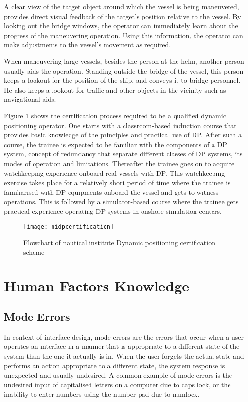 A clear view of the target object around which the vessel is being maneuvered, provides direct visual feedback of the target’s position relative to the vessel. By looking out the bridge windows, the operator can immediately learn about the progress of the maneuvering operation. Using this information, the operator can make adjustments to the vessel's movement as required.

When maneuvering large vessels, besides the person at the helm, another person usually aids the operation. Standing outside the bridge of the vessel, this person keeps a lookout for the position of the ship, and conveys it to bridge personnel. He also keeps a lookout for traffic and other objects in the vicinity such as navigational aids.

Figure \ref{fig:nidpcertification} shows the certification process required to be a qualified dynamic positioning operator. One starts with a classroom-based induction course that provides basic knowledge of the principles and practical use of DP. After such a course, the trainee is expected to be familiar with the components of a DP system, concept of redundancy that separate different classes of DP systems, its modes of operation and limitations. Thereafter the trainee goes on to acquire watchkeeping experience onboard real vessels with DP. This watchkeeping exercise takes place for a relatively short period of time where the trainee is familiarised with DP equipments onboard the vessel and gets to witness operations. This is followed by a simulator-based course where the trainee gets practical experience operating DP systems in onshore simulation centers. 

\begin{figure}
	\centering
	\texttt{[image: nidpcertification]}
	\caption{Flowchart of nautical institute Dynamic positioning certification scheme}
	\label{fig:nidpcertification}
\end{figure} 

\section{Human Factors Knowledge}
\subsection{Mode Errors}
In context of interface design, mode errors are the errors that occur when a user operates an interface in a manner that is appropriate to a different state of the system than the one it actually is in. When the user forgets the actual state and performs an action appropriate to a different state, the system response is unexpected and usually undesired. A common example of mode errors is the undesired input of capitalised letters on a computer due to caps lock, or the inability to enter numbers using the number pad due to numlock. 


